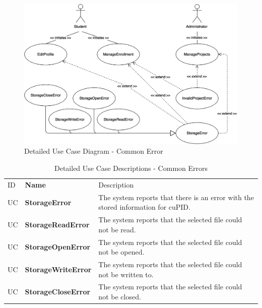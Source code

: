 \documentclass[12pt,letterpaper]{article}
\begin{document}
\begin{figure}[H]
	\centering{}
	\includegraphics[scale=0.3]{imgs/detailed-common-error-use-case-diagram.png}
	\caption{Detailed Use Case Diagram - Common Error}
\end{figure}

\begin{table}[H]
	\caption{Detailed Use Case Descriptions - Common Errors}
	\vspace{1em}
	\begin{tabu} to 
	    \tableheader{}ID & Name & Description\\
		UC & StorageError &  The system reports that there is an error with the stored information for cuPID. \\
		UC & StorageReadError & The system reports that the selected file could not be read. \\
		UC & StorageOpenError & The system reports that the selected file could not be opened. \\
		UC & StorageWriteError & The system reports that the selected file could not be written to. \\
		UC & StorageCloseError & The system reports that the selected file could not be closed. \\
	\end{tabu}
\end{table}
\end{document}

